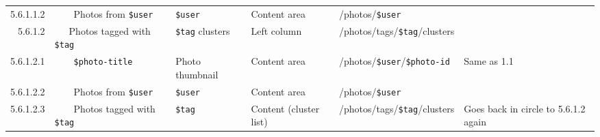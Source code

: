 \documentclass[12pt,a4paper]{article}
\newcommand{\var}[1]{\texttt{\${#1}}}
\begin{document}
\begin{landscape}
\begin{table}[h!b!p!]
\begin{center}
\begin{tiny}
\begin{tabular}{r|l|l|l|l|p{3cm}}
                    5.6.1.1.2 &
                    ~~~~Photos from \var{user} &
                    \var{user} &
                    Content area &
                    /photos/\var{user} &
                    \\

                  5.6.1.2 &
                  ~~~Photos tagged with \var{tag} &
                  \var{tag} clusters &
                  Left column &
                  /photos/tags/\var{tag}/clusters &
                  \\

                    5.6.1.2.1 &
                    ~~~~\var{photo-title} &
                    Photo thumbnail &
                    Content area &
                    /photos/\var{user}/\var{photo-id} &
                    Same as 1.1 \\

                    5.6.1.2.2 &
                    ~~~~Photos from \var{user} &
                    \var{user} &
                    Content area &
                    /photos/\var{user} &
                    \\

                    5.6.1.2.3 &
                    ~~~~Photos tagged with \var{tag} &
                    \var{tag} &
                    Content (cluster list) &
                    /photos/tags/\var{tag}/clusters &
                    Goes back in circle to 5.6.1.2 again \\

          \end{tabular}
        \rm
      \end{tiny}
    \end{center}
  \end{table}
\end{landscape}
\end{document}
